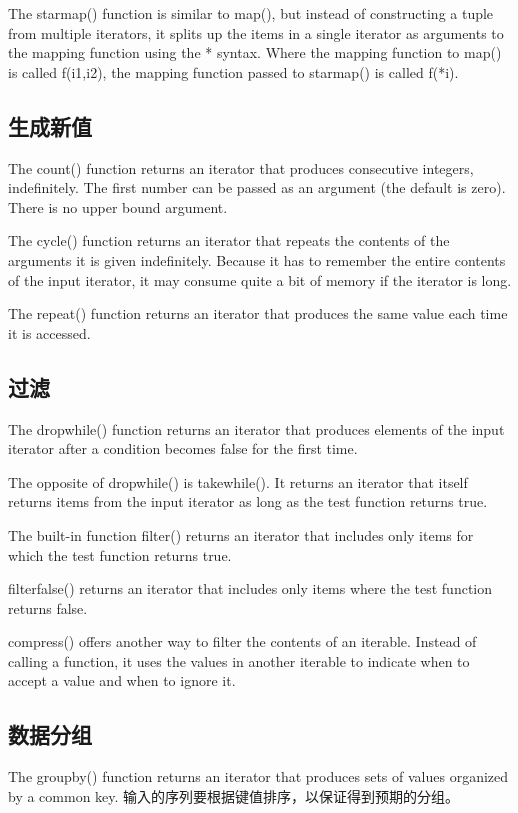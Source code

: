The starmap() function is similar to map(), but instead of constructing a tuple from multiple iterators, it splits up the items in a single iterator as arguments to the mapping function using the * syntax. Where the mapping function to map() is called f(i1,i2), the mapping function passed to starmap() is called f(*i).

\subsection{生成新值}
The count() function returns an iterator that produces consecutive integers, indefinitely. The first number can be passed as an argument (the default is zero). There is no upper bound argument.

The cycle() function returns an iterator that repeats the contents of the arguments it is given indefinitely. Because it has to remember the entire contents of the input iterator, it may consume quite a bit of memory if the iterator is long.

The repeat() function returns an iterator that produces the same value each time it is accessed.
\subsection{过滤}
The dropwhile() function returns an iterator that produces elements of the input iterator after a condition becomes false for the first time.

The opposite of dropwhile() is takewhile(). It returns an iterator that itself returns items from the input iterator as long as the test function returns true.

The built-in function filter() returns an iterator that includes only items for which the test function returns true.

filterfalse() returns an iterator that includes only items where the test function returns false.

compress() offers another way to filter the contents of an iterable. Instead of calling a function, it uses the values in another iterable to indicate when to accept a value and when to ignore it.

\subsection{数据分组}
The groupby() function returns an iterator that produces sets of values organized by a common key. 输入的序列要根据键值排序，以保证得到预期的分组。

